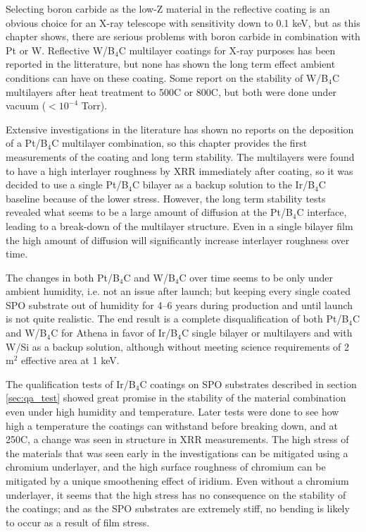 Selecting boron carbide as the low-Z material in the reflective coating is an obvious choice for an X-ray telescope with sensitivity down to 0.1 keV, but as this chapter shows, there are serious problems with boron carbide in combination with Pt or W. Reflective W/B$_4$C multilayer coatings for X-ray purposes has been reported in the litterature\cite{Jankowski:1991kx,Morawe:2007vp}, but none has shown the long term effect ambient conditions can have on these coating. Some report on the stability of W/B$_4$C multilayers after heat treatment to 500\degr C\cite{JANKOWSKI:1990vd} or 800\degr C\cite{Rao:2013dt}, but both were done under vacuum ($<10^{-4}$ Torr).

Extensive investigations in the literature has shown no reports on the deposition of a Pt/B$_4$C multilayer combination, so this chapter provides the first measurements of the coating and long term stability. The multilayers were found to have a high interlayer roughness by XRR immediately after coating, so it was decided to use a single Pt/B$_4$C bilayer as a backup solution to the Ir/B$_4$C baseline because of the lower stress. However, the long term stability tests revealed what seems to be a large amount of diffusion at the Pt/B$_4$C interface, leading to a break-down of the multilayer structure. Even in a single bilayer film the high amount of diffusion will significantly increase interlayer roughness over time.

The changes in both Pt/B$_4$C and W/B$_4$C over time seems to be only under ambient humidity, i.e. not an issue after launch; but keeping every single coated SPO substrate out of humidity for 4--6 years during production and until launch is not quite realistic. The end result is a complete disqualification of both Pt/B$_4$C and W/B$_4$C for Athena in favor of Ir/B$_4$C single bilayer or multilayers and with W/Si as a backup solution, although without meeting science requirements of 2 m$^2$ effective area at 1 keV.

The qualification tests of Ir/B$_4$C coatings on SPO substrates described in section \ref{sec:qa_test} showed great promise in the stability of the material combination even under high humidity and temperature. Later tests were done to see how high a temperature the coatings can withstand before breaking down, and at 250\degr C, a change was seen in structure in XRR measurements. The high stress of the materials that was seen early in the investigations can be mitigated using a chromium underlayer, and the high surface roughness of chromium can be mitigated by a unique smoothening effect of iridium. Even without a chromium underlayer, it seems that the high stress has no consequence on the stability of the coatings; and as the SPO substrates are extremely stiff, no bending is likely to occur as a result of film stress.

